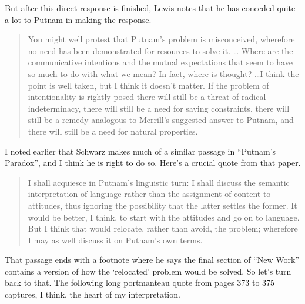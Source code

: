 \noindent But after this direct response is finished, Lewis notes that he has conceded quite a lot to Putnam in making the response.

\begin{quote}
You might well protest that Putnam's problem is misconceived, wh\-ere\-fore no need has been demonstrated for resources to solve it.\hspace{-2pt} \dots\hspace{-1pt} Wh\-ere are the communicative intentions and the mutual expectations that seem to have so much to do with what we mean? In fact, where is thought? \dots I think the point is well taken, but I think it doesn't matter. If the problem of intentionality is rightly posed there will still be a threat of radical indeterminacy, there will still be a need for saving constraints, there will still be a remedy analogous to Merrill's suggested answer to Putnam, and there will still be a need for natural properties.  \citep[373]{Lewis1983e}
\end{quote}

\noindent I noted earlier that Schwarz makes much of a similar passage in ``Putnam's Paradox'', and I think he is right to do so. Here's a crucial quote from that paper.

\begin{quote}
I shall acquiesce in Putnam's linguistic turn: I shall discuss the semantic interpretation of language rather than the assignment of content to attitudes, thus ignoring the possibility that the latter settles the former. It would be better, I think, to start with the attitudes and go on to language. But I think that would relocate, rather than avoid, the problem; wherefore I may as well discuss it on Putnam's own terms. \citep[222]{Lewis1984b}
\end{quote}

\noindent That passage ends with a footnote where he says the final section of ``New Work'' contains a version of how the `relocated' problem would be solved. So let's turn back to that. The following long portmanteau quote from pages 373 to 375 captures, I think, the heart of my interpretation.

